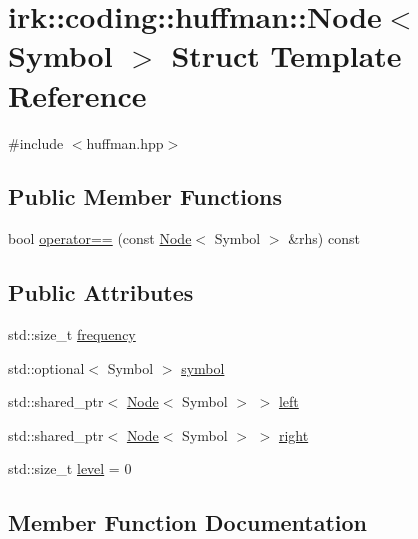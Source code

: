 \hypertarget{structirk_1_1coding_1_1huffman_1_1Node}{}\section{irk\+:\+:coding\+:\+:huffman\+:\+:Node$<$ Symbol $>$ Struct Template Reference}
\label{structirk_1_1coding_1_1huffman_1_1Node}


{\ttfamily \#include $<$huffman.\+hpp$>$}

\subsection*{Public Member Functions}
\begin{DoxyCompactItemize}
\item 
bool \mbox{\hyperlink{structirk_1_1coding_1_1huffman_1_1Node_a107abadd0a31ec2015bb64d272d90b7d}{operator==}} (const \mbox{\hyperlink{structirk_1_1coding_1_1huffman_1_1Node}{Node}}$<$ Symbol $>$ \&rhs) const
\end{DoxyCompactItemize}
\subsection*{Public Attributes}
\begin{DoxyCompactItemize}
\item 
std\+::size\+\_\+t \mbox{\hyperlink{structirk_1_1coding_1_1huffman_1_1Node_abbc9796a3581cba0148db661d6b351bc}{frequency}}
\item 
std\+::optional$<$ Symbol $>$ \mbox{\hyperlink{structirk_1_1coding_1_1huffman_1_1Node_af61be1ebb58460f02dc576cc0d93a100}{symbol}}
\item 
std\+::shared\+\_\+ptr$<$ \mbox{\hyperlink{structirk_1_1coding_1_1huffman_1_1Node}{Node}}$<$ Symbol $>$ $>$ \mbox{\hyperlink{structirk_1_1coding_1_1huffman_1_1Node_ab592b42ea185f45b9077572ac9816251}{left}}
\item 
std\+::shared\+\_\+ptr$<$ \mbox{\hyperlink{structirk_1_1coding_1_1huffman_1_1Node}{Node}}$<$ Symbol $>$ $>$ \mbox{\hyperlink{structirk_1_1coding_1_1huffman_1_1Node_adc2cb094b63cd58afecdee026a6d2168}{right}}
\item 
std\+::size\+\_\+t \mbox{\hyperlink{structirk_1_1coding_1_1huffman_1_1Node_aef69da83437b2a01d4db48eb1c0f32d0}{level}} = 0
\end{DoxyCompactItemize}


\subsection{Member Function Documentation}
\mbox{\label{structirk_1_1coding_1_1huffman_1_1Node_a107abadd0a31ec2015bb64d272d90b7d}} 
